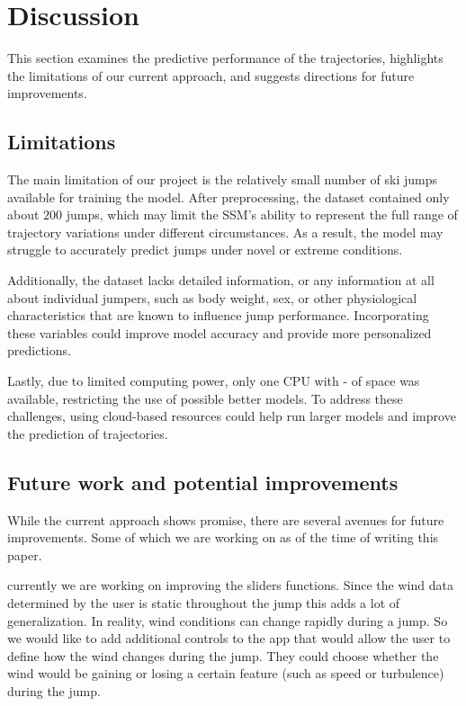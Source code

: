 \documentclass[sigconf,natbib=false, language=english]{acmart}
\begin{document}
\section{Discussion}
\label{sec:discussion}



This section examines the predictive performance of the trajectories, highlights the 
limitations of our current approach, and suggests directions for future improvements.

\subsection{Limitations}

The main limitation of our project is the relatively small number of ski jumps 
available for training the model. After preprocessing, the dataset contained 
only about $200$ jumps, which may limit the SSM's ability to represent the full 
range of trajectory variations under different circumstances. As a result, the 
model may struggle to accurately predict jumps under novel or extreme conditions.

Additionally, the dataset lacks detailed information, or any information at all 
about individual jumpers, such as body weight, sex, or other physiological characteristics 
that are known to influence jump performance. Incorporating these variables 
could improve model accuracy and provide more personalized predictions.

Lastly, due to limited computing power, only one CPU with - of space was 
available, restricting the use of possible better models. To address these 
challenges, using cloud-based resources could help run larger models and 
improve the prediction of trajectories.

\subsection{Future work and potential improvements}

While the current approach shows promise, there are several avenues for future
improvements. Some of which we are working on as of the time of writing this paper.

currently we are working on improving the sliders functions. Since the wind data 
determined by the user is static throughout the jump this adds a lot of generalization.
In reality, wind conditions can change rapidly during a jump. So we would like to
add additional controls to the app that would allow the user to define how the wind changes
during the jump. They could choose whether the wind would be gaining or losing a certain feature
(such as speed or turbulence) during the jump.
\end{document}
